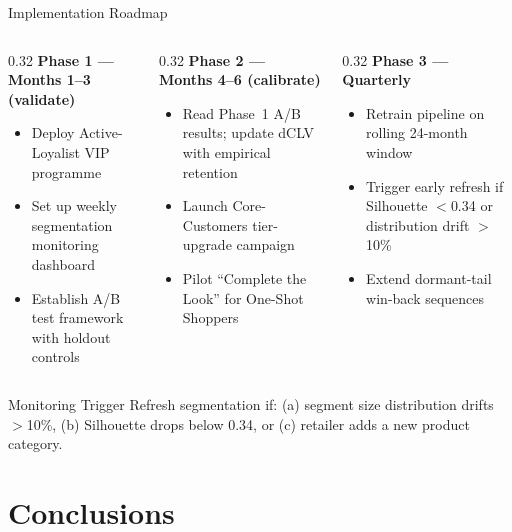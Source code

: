 \documentclass[aspectratio=169,10pt]{beamer}
\begin{document}
\begin{frame}{Implementation Roadmap}
\begin{columns}[T]
  \begin{column}{0.32\textwidth}
    \textbf{Phase 1 --- Months 1--3 (validate)}
    \begin{itemize}\small
      \item Deploy Active-Loyalist VIP programme
      \item Set up weekly segmentation monitoring dashboard
      \item Establish A/B test framework with holdout controls
    \end{itemize}
  \end{column}
  \begin{column}{0.32\textwidth}
    \textbf{Phase 2 --- Months 4--6 (calibrate)}
    \begin{itemize}\small
      \item Read Phase~1 A/B results; update dCLV with empirical retention
      \item Launch Core-Customers tier-upgrade campaign
      \item Pilot ``Complete the Look'' for One-Shot Shoppers
    \end{itemize}
  \end{column}
  \begin{column}{0.32\textwidth}
    \textbf{Phase 3 --- Quarterly}
    \begin{itemize}\small
      \item Retrain pipeline on rolling 24-month window
      \item Trigger early refresh if Silhouette $<$0.34 or distribution drift $>$10\%
      \item Extend dormant-tail win-back sequences
    \end{itemize}
  \end{column}
\end{columns}
\vspace{0.6em}
\begin{block}{Monitoring Trigger}
\small Refresh segmentation if: (a) segment size distribution drifts $>$10\%,
(b) Silhouette drops below 0.34, or (c) retailer adds a new product category.
\end{block}
\end{frame}

\section{Conclusions}
\end{document}
